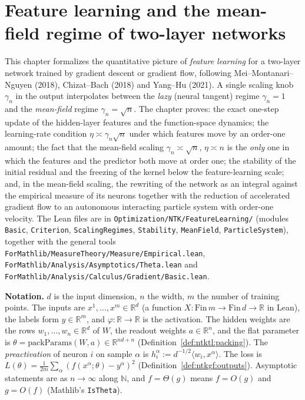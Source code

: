 \chapter{Feature learning and the mean-field regime of two-layer networks}\label{chap:ntkfl}

This chapter formalizes the quantitative picture of \emph{feature learning} for a two-layer network trained by
gradient descent or gradient flow, following Mei--Montanari--Nguyen (2018), Chizat--Bach (2018) and
Yang--Hu (2021). A single scaling knob $\gamma_n$ in the output interpolates between the
\emph{lazy} (neural tangent) regime $\gamma_n=1$ and the \emph{mean-field} regime $\gamma_n=\sqrt n$. The chapter proves:
the exact one-step update of the hidden-layer features and the function-space dynamics; the learning-rate condition
$\eta\asymp\gamma_n\sqrt n$ under which features move by an order-one amount; the fact that the mean-field scaling
$\gamma_n\asymp\sqrt n$, $\eta\asymp n$ is the \emph{only} one in which the features and the predictor both move at
order one; the stability of the initial residual and the freezing of the kernel below the feature-learning scale; and,
in the mean-field scaling, the rewriting of the network as an integral against the empirical measure of its neurons
together with the reduction of accelerated gradient flow to an autonomous interacting particle system with
order-one velocity.
The Lean files are in \texttt{Optimization/NTK/FeatureLearning/} (modules \texttt{Basic}, \texttt{Criterion},
\texttt{ScalingRegimes}, \texttt{Stability}, \texttt{MeanField}, \texttt{ParticleSystem}), together with the general
tools \texttt{ForMathlib/MeasureTheory/Measure/Empirical.lean},
\texttt{ForMathlib/Analysis/Asymptotics/Theta.lean} and \texttt{ForMathlib/Analysis/Calculus/Gradient/Basic.lean}.

\medskip\noindent\textbf{Notation.}
$d$ is the input dimension, $n$ the width, $m$ the number of training points. The inputs are
$x^1,\dots,x^m\in\mathbb R^d$ (a function $X:\mathrm{Fin}\,m\to\mathrm{Fin}\,d\to\mathbb R$ in Lean), the labels form
$y\in\mathbb R^m$, and $\varphi:\mathbb R\to\mathbb R$ is the activation. The hidden weights are the rows
$w_1,\dots,w_n\in\mathbb R^d$ of $W$, the readout weights $a\in\mathbb R^n$, and the flat parameter is
$\theta=\mathrm{packParams}(W,a)\in\mathbb R^{nd+n}$ (Definition~\ref{def:ntktl:packing}). The \emph{preactivation} of
neuron $i$ on sample $\alpha$ is $h_i^\alpha:=d^{-1/2}\langle w_i,x^\alpha\rangle$. The loss is
$L(\theta)=\frac1{2m}\sum_\alpha(f(x^\alpha;\theta)-y^\alpha)^2$ (Definition~\ref{def:ntkgf:outputs}).
Asymptotic statements are as $n\to\infty$ along $\mathbb N$, and $f=\Theta(g)$ means $f=O(g)$ and $g=O(f)$
(Mathlib's \texttt{IsTheta}).

